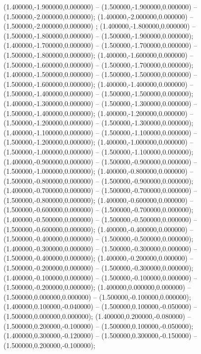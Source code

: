  (1.400000,-1.900000,0.000000) -- (1.500000,-1.900000,0.000000) -- (1.500000,-2.000000,0.000000);
 (1.400000,-2.000000,0.000000) -- (1.500000,-2.000000,0.000000) ;
 (1.400000,-1.800000,0.000000) -- (1.500000,-1.800000,0.000000) -- (1.500000,-1.900000,0.000000);
 (1.400000,-1.700000,0.000000) -- (1.500000,-1.700000,0.000000) -- (1.500000,-1.800000,0.000000);
 (1.400000,-1.600000,0.000000) -- (1.500000,-1.600000,0.000000) -- (1.500000,-1.700000,0.000000);
 (1.400000,-1.500000,0.000000) -- (1.500000,-1.500000,0.000000) -- (1.500000,-1.600000,0.000000);
 (1.400000,-1.400000,0.000000) -- (1.500000,-1.400000,0.000000) -- (1.500000,-1.500000,0.000000);
 (1.400000,-1.300000,0.000000) -- (1.500000,-1.300000,0.000000) -- (1.500000,-1.400000,0.000000);
 (1.400000,-1.200000,0.000000) -- (1.500000,-1.200000,0.000000) -- (1.500000,-1.300000,0.000000);
 (1.400000,-1.100000,0.000000) -- (1.500000,-1.100000,0.000000) -- (1.500000,-1.200000,0.000000);
 (1.400000,-1.000000,0.000000) -- (1.500000,-1.000000,0.000000) -- (1.500000,-1.100000,0.000000);
 (1.400000,-0.900000,0.000000) -- (1.500000,-0.900000,0.000000) -- (1.500000,-1.000000,0.000000);
 (1.400000,-0.800000,0.000000) -- (1.500000,-0.800000,0.000000) -- (1.500000,-0.900000,0.000000);
 (1.400000,-0.700000,0.000000) -- (1.500000,-0.700000,0.000000) -- (1.500000,-0.800000,0.000000);
 (1.400000,-0.600000,0.000000) -- (1.500000,-0.600000,0.000000) -- (1.500000,-0.700000,0.000000);
 (1.400000,-0.500000,0.000000) -- (1.500000,-0.500000,0.000000) -- (1.500000,-0.600000,0.000000);
 (1.400000,-0.400000,0.000000) -- (1.500000,-0.400000,0.000000) -- (1.500000,-0.500000,0.000000);
 (1.400000,-0.300000,0.000000) -- (1.500000,-0.300000,0.000000) -- (1.500000,-0.400000,0.000000);
 (1.400000,-0.200000,0.000000) -- (1.500000,-0.200000,0.000000) -- (1.500000,-0.300000,0.000000);
 (1.400000,-0.100000,0.000000) -- (1.500000,-0.100000,0.000000) -- (1.500000,-0.200000,0.000000);
 (1.400000,0.000000,0.000000) -- (1.500000,0.000000,0.000000) -- (1.500000,-0.100000,0.000000);
 (1.400000,0.100000,-0.040000) -- (1.500000,0.100000,-0.050000) -- (1.500000,0.000000,0.000000);
 (1.400000,0.200000,-0.080000) -- (1.500000,0.200000,-0.100000) -- (1.500000,0.100000,-0.050000);
 (1.400000,0.300000,-0.120000) -- (1.500000,0.300000,-0.150000) -- (1.500000,0.200000,-0.100000);
